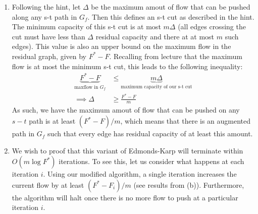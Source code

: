 \documentclass[12pt]{exam}
\begin{document}
\begin{questions}
\begin{solution}
\begin{enumerate}[label=(\alph*)]
    \item 
      Following the hint, let $\Delta$ be the maximum amout of flow that can be pushed along any s-t path in $G_f$. Then this defines an s-t cut as described in the hint. The minimum capacity of this s-t cut is at most $m \Delta$ (all edges crossing the cut must have less than $\Delta$ residual capacity and there at at most $m$ such edges). This value is also an upper bound on the maximum flow in the residual graph, given by $F^* - F$. Recalling from lecture that the maximum flow is at most the minimum s-t cut, this leads to the following inequality:
      \begin{align*}
        \underbrace{F^* - F}_{\text{maxflow in $G_f$}} &\leq \underbrace{m \Delta}_{\text{maximum capacity of our s-t cut}}  \\
        \implies \Delta &\geq \frac{F^* - F}{m}
      \end{align*}
      As such, we have the maximum amout of flow that can be pushed on any $s-t$ path is at least $(F^* - F) / m$, which means that there is an augmented path in $G_f$ such that every edge has residual capacity of at least this amount.

    \item
      We wish to proof that this variant of Edmonds-Karp will terminate within $O(m \log F^*)$ iterations. To see this, let us consider what happens at each iteration $i$. Using our modified algorithm, a single iteration increases the current flow by at least $(F^* - F_i)/m$ (see results from (b)). Furthermore, the algorithm will halt once there is no more flow to push at a particular iteration $i$. 


\end{enumerate}
\end{solution}
\end{questions}
\end{document}
